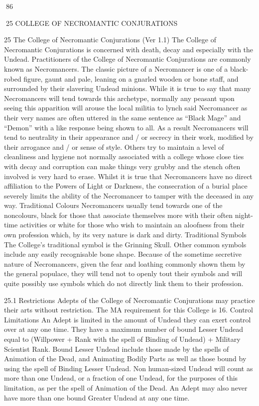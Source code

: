 \documentclass[a4paper]{article}
\begin{document}
\begin{multicols}{3}
86

25 COLLEGE OF NECROMANTIC CONJURATIONS

25 The College of Necromantic Conjurations (Ver 1.1)
The College of Necromantic Conjurations is concerned with death, decay and especially with the
Undead. Practitioners of the College of Necromantic Conjurations are commonly known as Necromancers. The classic picture of a Necromancer is
one of a black-robed figure, gaunt and pale, leaning
on a gnarled wooden or bone staff, and surrounded
by their slavering Undead minions. While it is true
to say that many Necromancers will tend towards
this archetype, normally any peasant upon seeing
this apparition will arouse the local militia to lynch
said Necromancer as their very names are often
uttered in the same sentence as “Black Mage” and
“Demon” with a like response being shown to all.
As a result Necromancers will tend to neutrality in
their appearance and / or secrecy in their work,
modified by their arrogance and / or sense of style.
Others try to maintain a level of cleanliness and
hygiene not normally associated with a college
whose close ties with decay and corruption can
make things very grubby and the stench often
involved is very hard to erase. Whilst it is true that
Necromancers have no direct affiliation to the
Powers of Light or Darkness, the consecration of a
burial place severely limits the ability of the Necromancer to tamper with the deceased in any way.
Traditional Colours
Necromancers usually tend towards one of the noncolours, black for those that associate themselves
more with their often night-time activities or white
for those who wish to maintain an aloofness from
their own profession which, by its very nature is
dark and dirty.
Traditional Symbols
The College’s traditional symbol is the Grinning
Skull. Other common symbols include any easily
recognisable bone shape. Because of the sometime
secretive nature of Necromancers, given the fear
and loathing commonly shown them by the general
populace, they will tend not to openly tout their
symbols and will quite possibly use symbols which
do not directly link them to their profession.

25.1 Restrictions
Adepts of the College of Necromantic Conjurations
may practice their arts without restriction.
The MA requirement for this College is 16.
Control Limitations
An Adept is limited in the amount of Undead they
can exert control over at any one time. They have a
maximum number of bound Lesser Undead equal
to (Willpower + Rank with the spell of Binding of
Undead) + Military Scientist Rank. Bound Lesser
Undead include those made by the spells of Animation of the Dead, and Animating Bodily Parts as
well as those bound by using the spell of Binding
Lesser Undead. Non human-sized Undead will
count as more than one Undead, or a fraction of
one Undead, for the purposes of this limitation, as
per the spell of Animation of the Dead. An Adept
may also never have more than one bound Greater
Undead at any one time.


\end{multicols}
\end{document}

